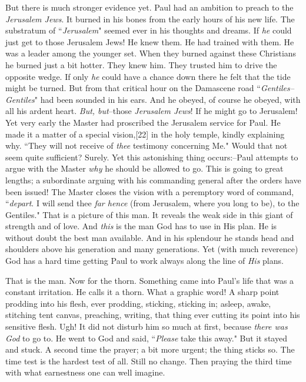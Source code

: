But there is much stronger evidence yet. Paul had an ambition to preach to
the \textit{Jerusalem Jews}. It burned in his bones from the early hours of his
new life. The substratum of ``\textit{Jerusalem}" seemed ever in his thoughts and
dreams. If \textit{he} could just get to those Jerusalem Jews! He knew them. He
had trained with them. He was a leader among the younger set. When they
burned against these Christians he burned just a bit hotter. They knew
him. They trusted him to drive the opposite wedge. If only \textit{he} could have
a chance down there he felt that the tide might be turned. But from that
critical hour on the Damascene road ``\textit{Gentiles--Gentiles}" had been
sounded in his ears. And he obeyed, of course he obeyed, with all his
ardent heart. \textit{But, but}--those \textit{Jerusalem Jews}! If he might go to
Jerusalem! Yet very early the Master had proscribed the Jerusalem service
for Paul. He made it a matter of a special vision,[22] in the holy temple,
kindly explaining why. ``They will not receive of \textit{thee} testimony
concerning Me." Would that not seem quite sufficient? Surely. Yet this
astonishing thing occurs:--Paul attempts to argue with the Master \textit{why} he
should be allowed to go. This is going to great lengths; a subordinate
arguing with his commanding general after the orders have been issued! The
Master closes the vision with a peremptory word of command, ``\textit{depart}. I
will send thee \textit{far hence} (from Jerusalem, where you long to be), to the
Gentiles." That is a picture of this man. It reveals the weak side in
this giant of strength and of love. And \textit{this} is the man God has to use
in His plan. He is without doubt the best man available. And in his
splendour he stands head and shoulders above his generation and many
generations. Yet (with much reverence) God has a hard time getting Paul to
work always along the line of \textit{His} plans.

That is the man. Now for the thorn. Something came into Paul's life that
was a constant irritation. He calls it a thorn. What a graphic word! A
sharp point prodding into his flesh, ever prodding, sticking, sticking in;
asleep, awake, stitching tent canvas, preaching, writing, that thing ever
cutting its point into his sensitive flesh. Ugh! It did not disturb him so
much at first, because \textit{there was God} to go to. He went to God and said,
``\textit{Please} take this away." But it stayed and stuck. A second time the
prayer; a bit more urgent; the thing sticks so. The time test is the
hardest test of all. Still no change. Then praying the third time with
what earnestness one can well imagine.

